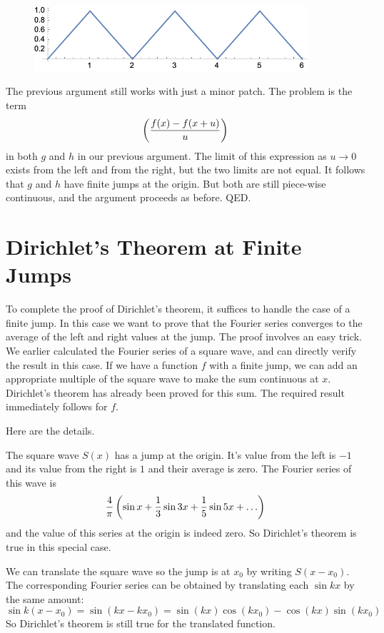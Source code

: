 \documentclass[11pt, oneside]{amsart}
\begin{document}
\begin{figure}[htbp] %
   \centering
   \includegraphics[width=4in]{Graphics/longwedge}
\end{figure}

The previous argument still works with just a minor patch. The problem is the term 
$$\left( {{f(x) - f(x + u)} \over {u}}\right)$$
in both $g$ and $h$ in our previous argument. The limit of this expression as $u \rightarrow 0$ exists from the left and from the right, but the two limits are not equal. It follows that $g$ and $h$ have finite jumps at the origin. But both are still piece-wise continuous, and the argument proceeds as before. QED.

\section{Dirichlet's Theorem at Finite Jumps}

To complete the proof of Dirichlet's theorem, it suffices to handle the case of a finite jump. In this case we want to prove that the Fourier series converges to the average of the left and right values at the jump. The proof involves an easy trick. We earlier calculated the Fourier series of a square wave, and can directly verify the result in this case. If we have a function $f$ with a finite jump, we can add an appropriate multiple of the square wave to make the sum continuous at $x$. Dirichlet's theorem has already been proved for this sum. The required result immediately follows for $f$.

Here are the details. 

The square wave $S(x)$ has a jump at the origin. It's value from the left is $-1$ and its value from the right is $1$ and their average is zero. The Fourier series of this wave is
$${4 \over \pi} \left( \sin x + {1 \over 3} \sin 3x + {1 \over 5} \sin 5x + \ldots \right)$$
and the value of this series at the origin is indeed zero. So Dirichlet's theorem is true in this special case.

We can translate the square wave so the jump is at $x_0$ by writing $S(x - x_0)$. The corresponding Fourier series can be obtained by translating each $\sin kx$ by the same amount: 
$$\sin k(x - x_0) = \sin (kx - k x_0) = \sin(kx) \cos (k x_0) - \cos(kx) \sin(k x_0)$$ So Dirichlet's theorem is still true for the translated function.
\end{document}
